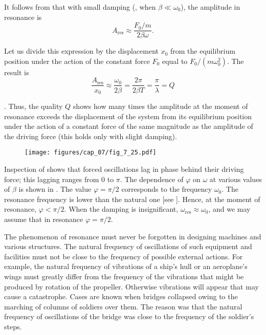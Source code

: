 It follows from  that with small damping (\ie, when $\beta\ll\omega_0$), the amplitude in resonance is
\begin{equation*}
	A_{\text{res}} \approx \frac{F_0/m}{2\beta\omega}.
\end{equation*}

\noindent
Let us divide this expression by the displacement $x_0$ from the equilibrium position under the action of the constant force $F_0$ equal to $F_0/(m\omega_0^2)$. The result is
\begin{equation}\label{eq:7_129}
	\frac{A_{\text{res}}}{x_0} \approx \frac{\omega_0}{2\beta} = \frac{2\pi}{2\beta T} = \frac{\pi}{\lambda} = Q
\end{equation}

. Thus, the quality $Q$ shows how many times the amplitude at the moment of resonance exceeds the displacement of the system from its equilibrium position under the action of a constant force of the same magnitude as the amplitude of the driving force (this holds only with slight damping).

\begin{figure}[t]
	\begin{center}
		\texttt{[image: figures/cap\_07/fig\_7\_25.pdf]}
		\caption[]{}
		\label{fig:7_25}
	\end{center}
	\vspace{-0.8cm}
\end{figure}

Inspection of  shows that forced oscillations lag in phase behind their driving force; this lagging ranges from $0$ to $\pi$. The dependence of $\varphi$ on $\omega$ at various values of $\beta$ is shown in . The value $\varphi=\pi/2$ corresponds to the frequency $\omega_0$. The resonance frequency is lower than the natural one [see ]. Hence, at the moment of resonance, $\varphi<\pi/2$. When the damping is insignificant, $\omega_{\text{res}}\approx\omega_0$, and we may assume that in resonance $\varphi=\pi/2$.

The phenomenon of resonance must never be forgotten in designing machines and various structures. The natural frequency of oscillations of such equipment and facilities must not be close to the frequency of possible external actions. For example, the natural frequency of vibrations of a ship's hull or an aeroplane's wings must greatly differ from the frequency of the vibrations that might be produced by rotation of the propeller. Otherwise vibrations will appear that may cause a catastrophe. Cases are known when bridges collapsed owing to the marching of columns of soldiers over them. The reason was that the natural frequency of oscillations of the bridge was close to the frequency of the soldier's steps.

